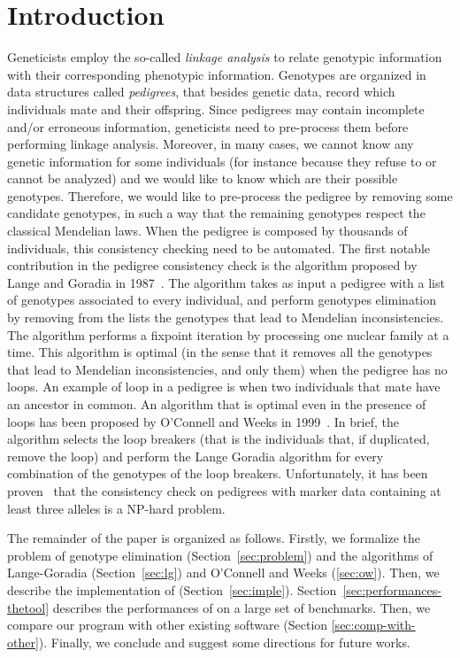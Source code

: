 \section{Introduction}
\label{sec:intro}
Geneticists employ the so-called \emph{linkage analysis} to relate genotypic
information with their corresponding phenotypic information.  Genotypes are
organized in data structures called \emph{pedigrees}, that besides genetic data,
record which individuals mate and their offspring. Since pedigrees may contain
incomplete and/or erroneous information, geneticists need to pre-process them
before performing linkage analysis.  Moreover, in many cases, we cannot know any
genetic information for some individuals (for instance because they refuse to or
cannot be analyzed) and we would like to know which are their possible
genotypes. Therefore, we would like to pre-process the pedigree by removing some
candidate genotypes, in such a way that the remaining genotypes respect the
classical Mendelian laws. When the pedigree is composed by thousands of
individuals, this consistency checking need to be automated. The first notable
contribution in the pedigree consistency check is the algorithm proposed by
Lange and Goradia in 1987~\cite{LangeGoradia1987}. The algorithm takes as input
a pedigree with a list of genotypes associated to every individual, and perform
genotypes elimination by removing from the lists the genotypes that lead to
Mendelian inconsistencies. The algorithm performs a fixpoint iteration by
processing one nuclear family at a time. This algorithm is optimal (in the
sense that it removes all the genotypes that lead to Mendelian
inconsistencies, and only them) when the pedigree has no loops. An example of
loop in a pedigree is 
when two individuals that mate have an ancestor in common. An algorithm that is
optimal even in the presence of loops has been proposed by O'Connell and Weeks
in 1999~\cite{OConnellWeeks1999}. In brief, the algorithm selects the loop
breakers (that is the individuals that, if duplicated, remove the loop) and
perform the Lange Goradia algorithm for every combination of the genotypes of
the loop breakers. Unfortunately, it has been proven~\cite{Aceto2004} that the
consistency check on pedigrees with marker data containing at least three
alleles is a NP-hard problem.


The remainder of the paper is organized as follows. Firstly, we formalize the
problem of genotype elimination (Section~\ref{sec:problem}) and the algorithms of
Lange-Goradia (Section~\ref{sec:lg}) and O'Connell and Weeks
(\ref{sec:ow}). Then, we describe the implementation of {}
(Section~\ref{sec:imple}). Section~\ref{sec:performances-thetool} describes the
performances of {} on a large set of benchmarks. Then, we compare our
program with other existing software (Section
\ref{sec:comp-with-other}). Finally, we conclude and suggest some directions for
future works.

